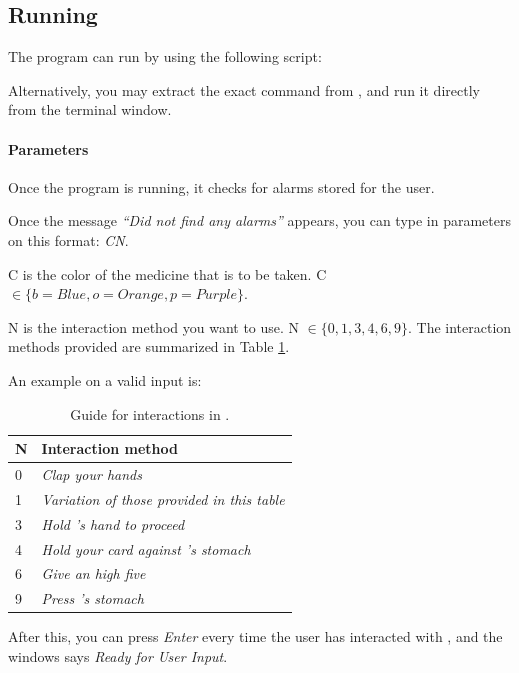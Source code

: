 \subsection{Running}
The program can run by using the following script:


Alternatively, you may extract the exact command from , and run it directly from the terminal window. 

\paragraph{Parameters}

Once the program is running, it checks for alarms stored for the user. 

Once the message \emph{``Did not find any alarms''} appears, you can type in parameters on this format: \emph{CN}. 

C is the color of the medicine that is to be taken. C $\in \{ b = Blue, o = Orange, p = Purple \}$.

N is the interaction method you want to use. N $\in \{ 0, 1, 3, 4, 6, 9\}$. The interaction methods provided are summarized in Table \ref{tab:interactionmethodsguide}.

An example on a valid input is:


\begin{table}[H]
\begin{tabular}{|p{3.0cm} | p{7.0cm}|}
\hline
\textbf{N} & \textbf{Interaction method} \\
\hline
0 & \emph{Clap your hands} \\
\hline
1 & \emph{Variation of those provided in this table} \\
\hline
3 & \emph{Hold \ab{}'s hand to proceed} \\
\hline
4 & \emph{Hold your card against \ab{}'s stomach}\\
\hline
6 & \emph{Give an high five} \\
\hline
9 & \emph{Press \ab{}'s stomach} \\
\hline
\end{tabular}
\caption{Guide for interactions in \ab{}.}
\label{tab:interactionmethodsguide}
\end{table}

After this, you can press \emph{Enter} every time the user has interacted with \ab{}, and the windows says \emph{Ready for User Input}. 